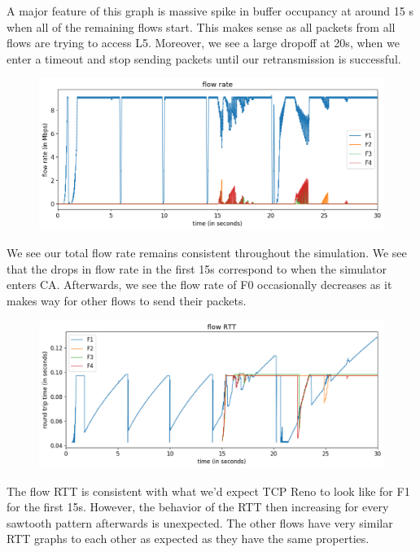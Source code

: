 \documentclass{article}
\begin{document}
A major feature of this graph is massive spike in buffer occupancy at around 15 s when all of the remaining flows start. This makes sense as all packets from all flows are trying to access L5. Moreover, we see a large dropoff at 20s, when we enter a timeout and stop sending packets until our retransmission is successful. 

\begin{figure}[H]
\centering
\includegraphics[width = \textwidth]{test_case5_reno flow rate.png}
\end{figure}

We see our total flow rate remains consistent throughout the simulation. We see that the drops in flow rate in the first 15s correspond to when the simulator enters CA. Afterwards, we see the flow rate of F0 occasionally decreases as it makes way for other flows to send their packets.

\begin{figure}[H]
\centering
\includegraphics[width = \textwidth]{test_case5_reno flow RTT.png}
\end{figure}

The flow RTT is consistent with what we'd expect TCP Reno to look like for F1 for the first 15s. However, the behavior of the RTT then increasing for every sawtooth pattern afterwards is unexpected. The other flows have very similar RTT graphs to each other as expected as they have the same properties.
\end{document}
